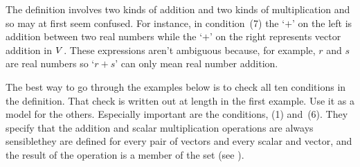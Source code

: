 \begin{remark}
The definition involves two kinds of addition and two kinds of multiplication
and so may at first seem confused.
For instance, in condition~(7)
the `$+$' on the left is addition between two real numbers
while the `$+$' on the right represents vector addition in
\( V\/ \).
These expressions aren't ambiguous because, for example,
\( r \) and \( s \)
are real numbers so `\( r+s \)' can only mean real number addition.
\end{remark}

The best way to go through the examples below is to
check all ten conditions in the definition.
That check is written out at length in the first example.
Use it as a model for the others.
Especially important are the 
conditions, (1) and~(6).
They specify that the addition and scalar multiplication operations
are always sensible\Dash they are defined for every pair of vectors 
and every scalar and vector,
and the result of the operation is a member of the set
(see ). 

